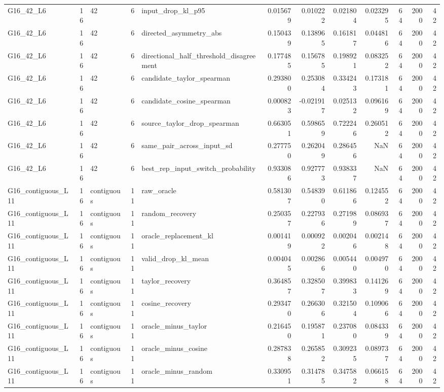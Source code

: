 \begin{tabular}{lrlrlrrrrrrr}
G16_42_L6 & 16 & 42 & 6 & input_drop_kl_p95 & 0.015679 & 0.010222 & 0.021804 & 0.023295 & 64 & 2000 & 42 \\
G16_42_L6 & 16 & 42 & 6 & directed_asymmetry_abs & 0.150439 & 0.138965 & 0.161817 & 0.044816 & 64 & 2000 & 42 \\
G16_42_L6 & 16 & 42 & 6 & directional_half_threshold_disagreement & 0.177485 & 0.156785 & 0.198921 & 0.083252 & 64 & 2000 & 42 \\
G16_42_L6 & 16 & 42 & 6 & candidate_taylor_spearman & 0.293800 & 0.253084 & 0.334243 & 0.173181 & 64 & 2000 & 42 \\
G16_42_L6 & 16 & 42 & 6 & candidate_cosine_spearman & 0.000823 & -0.021917 & 0.025132 & 0.096169 & 64 & 2000 & 42 \\
G16_42_L6 & 16 & 42 & 6 & source_taylor_drop_spearman & 0.663051 & 0.598659 & 0.722246 & 0.260512 & 64 & 2000 & 42 \\
G16_42_L6 & 16 & 42 & 6 & same_pair_across_input_sd & 0.277750 & 0.262049 & 0.286456 & NaN & 64 & 2000 & 42 \\
G16_42_L6 & 16 & 42 & 6 & best_rep_input_switch_probability & 0.933086 & 0.927773 & 0.938337 & NaN & 64 & 2000 & 42 \\
G16_contiguous_L11 & 16 & contiguous & 11 & raw_oracle & 0.581307 & 0.548390 & 0.611866 & 0.124552 & 64 & 2000 & 42 \\
G16_contiguous_L11 & 16 & contiguous & 11 & random_recovery & 0.250357 & 0.227936 & 0.271989 & 0.086937 & 64 & 2000 & 42 \\
G16_contiguous_L11 & 16 & contiguous & 11 & oracle_replacement_kl & 0.001419 & 0.000922 & 0.002046 & 0.002148 & 64 & 2000 & 42 \\
G16_contiguous_L11 & 16 & contiguous & 11 & valid_drop_kl_mean & 0.004045 & 0.002866 & 0.005440 & 0.004970 & 64 & 2000 & 42 \\
G16_contiguous_L11 & 16 & contiguous & 11 & taylor_recovery & 0.364857 & 0.328507 & 0.399833 & 0.141269 & 64 & 2000 & 42 \\
G16_contiguous_L11 & 16 & contiguous & 11 & cosine_recovery & 0.293470 & 0.266306 & 0.321504 & 0.109066 & 64 & 2000 & 42 \\
G16_contiguous_L11 & 16 & contiguous & 11 & oracle_minus_taylor & 0.216450 & 0.195871 & 0.237080 & 0.084339 & 64 & 2000 & 42 \\
G16_contiguous_L11 & 16 & contiguous & 11 & oracle_minus_cosine & 0.287838 & 0.265852 & 0.309235 & 0.089737 & 64 & 2000 & 42 \\
G16_contiguous_L11 & 16 & contiguous & 11 & oracle_minus_random & 0.330951 & 0.314785 & 0.347582 & 0.066158 & 64 & 2000 & 42 \\

\end{tabular}
